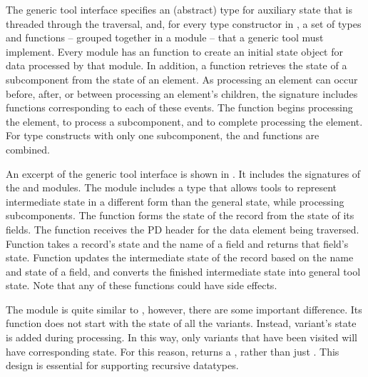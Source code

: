 
The generic tool interface specifies an (abstract) type for auxiliary
state that is threaded through the traversal, and, for every type
constructor in \padsml{}, a set of types and functions -- grouped
together in a module -- that a generic tool must implement. Every
module has an  function to create an initial state object for
data processed by that module. In addition, a  function
retrieves the state of a subcomponent from the state of an element. As
processing an element can occur before, after, or between processing
an element's children, the signature includes functions corresponding
to each of these events. The function  begins processing the
element,  to process a subcomponent, and 
to complete processing the element. For type constructs with only one
subcomponent, the  and  functions are combined.

An excerpt of the generic tool interface is shown in
. It includes the signatures of the
 and  modules. The  module includes
a type  that allows tools to represent intermediate
state in a different form than the general state, while processing
subcomponents. The  function forms the state of the record
from the state of its fields. The  function receives the PD
header for the data element being traversed. Function 
takes a record's state and the name of a field and returns that
field's state. Function  updates the intermediate
state of the record based on the name and state of a field, and
 converts the finished intermediate state into general tool
state.  Note that any of these functions could have side effects.

The  module is quite similar to , however,
there are some important difference. Its  function does not
start with the state of all the variants. Instead, variant's state is
added during processing. In this way, only variants that have been
visited will have corresponding state. For this reason, 
returns a , rather than just . This design
is essential for supporting recursive datatypes.

